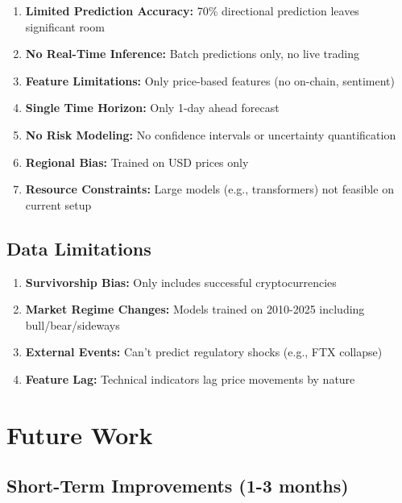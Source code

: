 \begin{enumerate}
    \item \textbf{Limited Prediction Accuracy:} 70\% directional prediction leaves significant room
    \item \textbf{No Real-Time Inference:} Batch predictions only, no live trading
    \item \textbf{Feature Limitations:} Only price-based features (no on-chain, sentiment)
    \item \textbf{Single Time Horizon:} Only 1-day ahead forecast
    \item \textbf{No Risk Modeling:} No confidence intervals or uncertainty quantification
    \item \textbf{Regional Bias:} Trained on USD prices only
    \item \textbf{Resource Constraints:} Large models (e.g., transformers) not feasible on current setup
\end{enumerate}

\subsection{Data Limitations}

\begin{enumerate}
    \item \textbf{Survivorship Bias:} Only includes successful cryptocurrencies
    \item \textbf{Market Regime Changes:} Models trained on 2010-2025 including bull/bear/sideways
    \item \textbf{External Events:} Can't predict regulatory shocks (e.g., FTX collapse)
    \item \textbf{Feature Lag:} Technical indicators lag price movements by nature
\end{enumerate}

\section{Future Work}

\subsection{Short-Term Improvements (1-3 months)}

